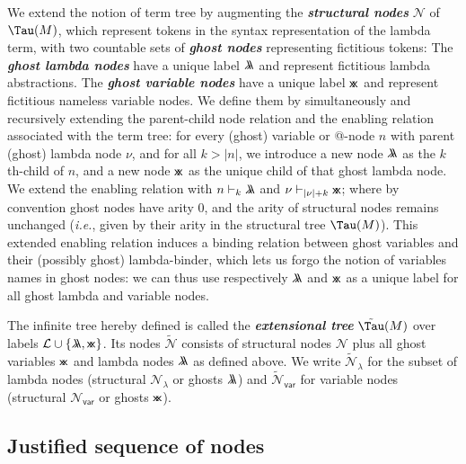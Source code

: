 \documentclass[xchauthor,chkrefs,GCNS,amsmath,amsthm,rotating,leaveRGB]{tcsg}
\renewcommand{\index}[1]{}
\theoremstyle{plain}
\theoremstyle{definition}
\newcommand{\Nodes}{\mathcal{N}}
\newcommand{\NodesVar}{\Nodes_{\mathsf{var}}}
\newcommand{\NodesLmd}{\Nodes_\lambda}
\newcommand{\ExtendedNodes}{\tilde{\Nodes}}
\newcommand{\ExtendedNodesVar}{\tilde{\Nodes}_{\mathsf{var}}}
\newcommand{\ExtendedNodesLmd}{\tilde{\Nodes}_{\lambda}}
\newcommand{\ghostlmd}{{\lambda\mkern-7mu \lambda}}
\newcommand{\ghostvar}{\mathsf{x\mkern-5mu x}}
\newcommand{\enables}{\vdash}
\newcommand{\ctree}{\Tau}
\newcommand{\exttree}{\tilde{\Tau}}
\begin{document}
We extend the notion of term tree by augmenting the \textbf{\emph{structural
nodes}}\index{structural nodes} $\Nodes $ of $\ctree (M)$, which represent
tokens in the syntax representation of the lambda term, with two countable
sets of \textbf{\emph{ghost nodes}}\index{ghost nodes} representing
fictitious tokens: The \textbf{\emph{ghost lambda nodes}}\index{ghost lambda
nodes}  have a unique label $\ghostlmd $ and represent fictitious lambda
abstractions. The \textbf{\emph{ghost variable nodes}}\index{ghost variable
nodes} have a unique label $\ghostvar $ and represent fictitious nameless
variable nodes. We define them by simultaneously and recursively extending
the parent-child node relation and the enabling relation associated with the
term tree: for every (ghost) variable or @-node $n$ with parent (ghost)
lambda node $\nu $, and for all $k>|n|$, we introduce a new node $\ghostlmd $
as the $k$th-child of $n$, and a new node $\ghostvar $ as the unique child of
that ghost lambda node. We extend the enabling relation with $n \enables _{k}
\ghostlmd $ and $\nu \enables _{|\nu |+ k} \ghostvar $; where by convention
ghost nodes have arity $0$, and the arity of structural nodes remains
unchanged (\textit{i.e.}, given by their arity in the structural tree $\ctree
(M)$). This extended enabling relation induces a binding relation between
ghost variables and their (possibly ghost) lambda-binder, which lets us forgo
the notion of variables names in ghost nodes: we can thus use respectively
$\ghostlmd $ and $\ghostvar $ as a unique label for all ghost lambda and
variable nodes.

The infinite tree hereby defined is called the \textbf{\emph{extensional
tree}}\index{extensional tree} $\exttree (M)$ over labels $\mathcal{L} \cup
\{ \ghostlmd , \ghostvar \}$. Its nodes $\ExtendedNodes $ consists of
structural nodes $\Nodes $ plus all ghost variables $\ghostvar $ and lambda
nodes $\ghostlmd $ as defined above. We write $\ExtendedNodesLmd $ for the
subset of lambda nodes (structural $\NodesLmd $ or ghosts $\ghostlmd $) and
$\ExtendedNodesVar $ for variable nodes (structural $\NodesVar $ or ghosts
$\ghostvar $).

\subsection{Justified sequence of nodes}\label{sec:justseq}
\end{document}
